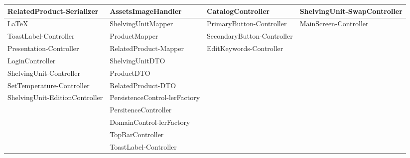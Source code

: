 \documentclass[a4paper,12pt]{report}
\begin{document}
\begin{itemize}
\begin{table}[H]
\begin{tabularx}{\textwidth}{|X|X|X|X|}
			RelatedProduct-\newline Serializer & AssetsImageHandler & CatalogController                 &   ShelvingUnit-\newline SwapController               \\
			\hline
			\LaTeX & ShelvingUnitMapper & PrimaryButton-\newline Controller                 &  MainScreen-\newline Controller               \\
			\hline
			ToastLabel-\newline Controller & ProductMapper & SecondaryButton-\newline Controller                 &                 \\
			\hline
			Presentation-\newline Controller & RelatedProduct-\newline Mapper & EditKeywords-\newline Controller                 &                 \\
			\hline
			LoginController & ShelvingUnitDTO &                 &                 \\
			\hline
			ShelvingUnit-\newline Controller & ProductDTO &                 &                 \\
			\hline
			SetTemperature-\newline Controller & RelatedProduct-\newline DTO &                 &                 \\
			\hline
			ShelvingUnit-\newline EditionController& PersistenceControl-\newline lerFactory &                   &                 \\
			\hline
			& PersitenceController &                   &                 \\
			\hline
			& DomainControl-\newline  lerFactory &                  &                 \\
			\hline
			&TopBarController &                  &                 \\
			\hline
			&ToastLabel-\newline Controller &                  &                 \\
			\hline
		\end{tabularx}
	\end{table}


\end{itemize}
\end{document}
